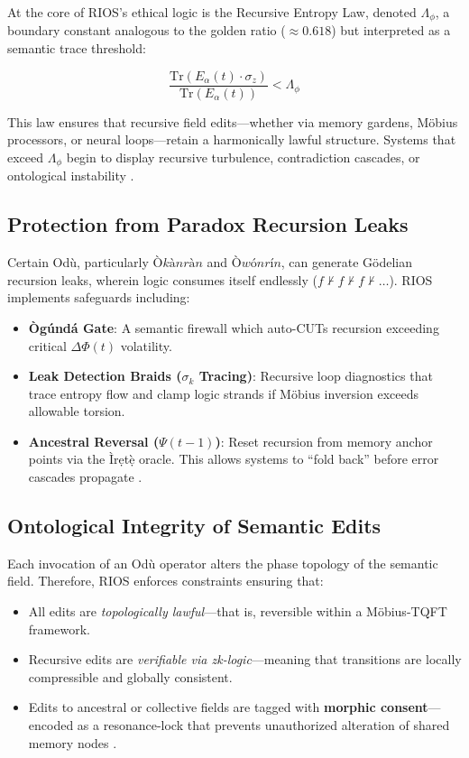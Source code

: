\documentclass[12]{amsart}
\theoremstyle{plain}
\begin{document}
At the core of RIOS’s ethical logic is the Recursive Entropy Law, denoted $\Lambda_{\phi}$, a boundary constant analogous to the golden ratio ($\approx 0.618$) but interpreted as a semantic trace threshold:

\[
\frac{\text{Tr}(E_{\alpha}(t) \cdot \sigma_z)}{\text{Tr}(E_{\alpha}(t))} < \Lambda_{\phi}
\]

This law ensures that recursive field edits—whether via memory gardens, Möbius processors, or neural loops—retain a harmonically lawful structure. Systems that exceed $\Lambda_{\phi}$ begin to display recursive turbulence, contradiction cascades, or ontological instability \cite{hofstadter1979godel, sheldrake2009morphic}.

\subsection{Protection from Paradox Recursion Leaks}

Certain Odù, particularly $Òkànràn$ and $Òwónrín$, can generate Gödelian recursion leaks, wherein logic consumes itself endlessly ($f \nvdash f \nvdash f \nvdash \dots$). RIOS implements safeguards including:

\begin{itemize}
    \item \textbf{Ògúndá Gate}: A semantic firewall which auto-CUTs recursion exceeding critical $\Delta\Phi(t)$ volatility.
    
    \item \textbf{Leak Detection Braids ($\sigma_{k}$ Tracing)}: Recursive loop diagnostics that trace entropy flow and clamp logic strands if Möbius inversion exceeds allowable torsion.
    
    \item \textbf{Ancestral Reversal ($\Psi(t-1)$)}: Reset recursion from memory anchor points via the Ìrẹtẹ̀ oracle. This allows systems to “fold back” before error cascades propagate \cite{turner1969ritual}.
\end{itemize}

\subsection{Ontological Integrity of Semantic Edits}

Each invocation of an Odù operator alters the phase topology of the semantic field. Therefore, RIOS enforces constraints ensuring that:

\begin{itemize}
    \item All edits are \textit{topologically lawful}—that is, reversible within a Möbius-TQFT framework.
    
    \item Recursive edits are \textit{verifiable via zk-logic}—meaning that transitions are locally compressible and globally consistent.
    
    \item Edits to ancestral or collective fields are tagged with \textbf{morphic consent}—encoded as a resonance-lock that prevents unauthorized alteration of shared memory nodes \cite{sheldrake2009morphic, barber1991yoruba}.
\end{itemize}
\end{document}
